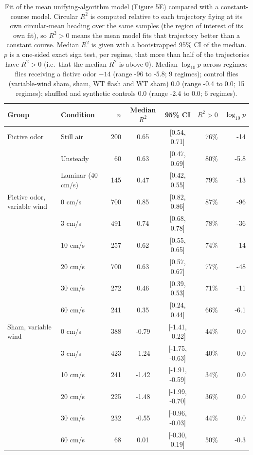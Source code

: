 \begin{table}[ht]
\centering
\caption{Fit of the mean unifying-algorithm model (Figure 5E) compared with a constant-course model. Circular $R^2$ is computed relative to each trajectory flying at its own circular-mean heading over the same samples (the region of interest of its own fit), so $R^2 > 0$ means the mean model fits that trajectory better than a constant course. Median $R^2$ is given with a bootstrapped 95\% CI of the median. $p$ is a one-sided exact sign test, per regime, that more than half of the trajectories have $R^2 > 0$ (i.e.\ that the median $R^2$ is above 0). Median $\log_{10} p$ across regimes: flies receiving a fictive odor $-14$ (range -96 to -5.8; 9 regimes); control flies (variable-wind sham, sham, WT flash and WT sham) $0.0$ (range -0.4 to 0.0; 15 regimes); shuffled and synthetic controls $0.0$ (range -2.4 to 0.0; 6 regimes).}
\label{tab:mean_model_pvalues}
\begin{tabular}{llrccrr}
\hline
Group & Condition & $n$ & Median $R^2$ & 95\% CI & $R^2 > 0$ & $\log_{10} p$ \\
\hline
Fictive odor & Still air & 200 & 0.65 & [0.54, 0.71] & 76\% & -14 \\
 & Unsteady & 60 & 0.63 & [0.47, 0.69] & 80\% & -5.8 \\
 & Laminar (40 cm/s) & 145 & 0.47 & [0.42, 0.55] & 79\% & -13 \\
\hline
Fictive odor, variable wind & 0 cm/s & 700 & 0.85 & [0.82, 0.86] & 87\% & -96 \\
 & 3 cm/s & 491 & 0.74 & [0.68, 0.78] & 78\% & -36 \\
 & 10 cm/s & 257 & 0.62 & [0.55, 0.65] & 74\% & -14 \\
 & 20 cm/s & 700 & 0.63 & [0.57, 0.67] & 77\% & -48 \\
 & 30 cm/s & 272 & 0.46 & [0.39, 0.53] & 71\% & -11 \\
 & 60 cm/s & 241 & 0.35 & [0.24, 0.44] & 66\% & -6.1 \\
\hline
Sham, variable wind & 0 cm/s & 388 & -0.79 & [-1.41, -0.22] & 44\% & 0.0 \\
 & 3 cm/s & 423 & -1.24 & [-1.75, -0.63] & 40\% & 0.0 \\
 & 10 cm/s & 241 & -1.42 & [-1.91, -0.59] & 34\% & 0.0 \\
 & 20 cm/s & 225 & -1.48 & [-1.99, -0.70] & 36\% & 0.0 \\
 & 30 cm/s & 232 & -0.55 & [-0.96, -0.03] & 44\% & 0.0 \\
 & 60 cm/s & 68 & 0.01 & [-0.30, 0.19] & 50\% & -0.3 \\

\end{tabular}
\end{table}
